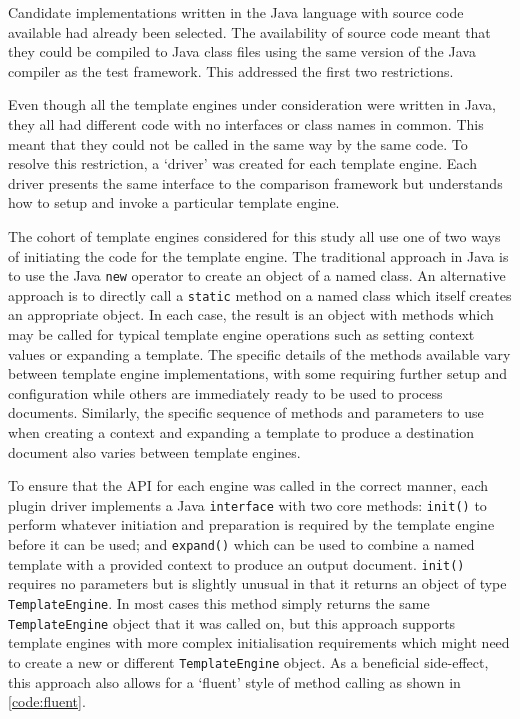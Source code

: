 Candidate implementations written in the Java language with source code available had already been selected. The availability of source code meant that they could be compiled to Java class files using the same version of the Java compiler as the test framework. This addressed the first two restrictions.

Even though all the template engines under consideration were written in Java, they all had different code with no interfaces or class names in common. This meant that they could not be called in the same way by the same code. To resolve this restriction, a `driver' was created for each template engine. Each driver presents the same interface to the comparison framework but understands how to setup and invoke a particular template engine.

The cohort of template engines considered for this study all use one of two ways of initiating the code for the template engine. The traditional approach in Java is to use the Java \verb!new! operator to create an object of a named class. An alternative approach is to directly call a \verb!static! method on a named class which itself creates an appropriate object. In each case, the result is an object with methods which may be called for typical template engine operations such as setting context values or expanding a template. The specific details of the methods available vary between template engine implementations, with some requiring further setup and configuration while others are immediately ready to be used to process documents. Similarly, the specific sequence of methods and parameters to use when creating a context and expanding a template to produce a destination document also varies between template engines.

To ensure that the API for each engine was called in the correct manner, each plugin driver implements a Java \verb!interface! with two core methods: \verb!init()! to perform whatever initiation and preparation is required by the template engine before it can be used; and \verb!expand()! which can be used to combine a named template with a provided context to produce an output document. \verb!init()! requires no parameters but is slightly unusual in that it returns an object of type \verb!TemplateEngine!. In most cases this method simply returns the same \verb!TemplateEngine! object that it was called on, but this approach supports template engines with more complex initialisation requirements which might need to create a new or different \verb!TemplateEngine! object. As a beneficial side-effect, this approach also allows for a `fluent' style of method calling \citep{JavaDesignPatterns} as shown in \autoref{code:fluent}.

